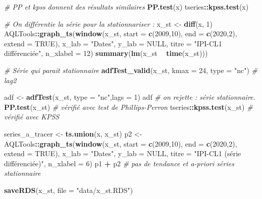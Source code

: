 \documentclass[french]{article}
\newenvironment{Shaded}{\begin{snugshade}}{\end{snugshade}}
\newcommand{\CommentTok}[1]{\textcolor[rgb]{0.56,0.35,0.01}{\textit{#1}}}
\newcommand{\DataTypeTok}[1]{\textcolor[rgb]{0.13,0.29,0.53}{#1}}
\newcommand{\DecValTok}[1]{\textcolor[rgb]{0.00,0.00,0.81}{#1}}
\newcommand{\KeywordTok}[1]{\textcolor[rgb]{0.13,0.29,0.53}{\textbf{#1}}}
\newcommand{\NormalTok}[1]{#1}
\newcommand{\OperatorTok}[1]{\textcolor[rgb]{0.81,0.36,0.00}{\textbf{#1}}}
\newcommand{\OtherTok}[1]{\textcolor[rgb]{0.56,0.35,0.01}{#1}}
\newcommand{\StringTok}[1]{\textcolor[rgb]{0.31,0.60,0.02}{#1}}
\begin{document}
\begin{Shaded}
\begin{Highlighting}[]
\CommentTok{# PP et kpss donnent des résultats similaires}
\KeywordTok{PP.test}\NormalTok{(x) }
\NormalTok{tseries}\OperatorTok{::}\KeywordTok{kpss.test}\NormalTok{(x)}


\CommentTok{# On différentie la série pour la stationnariser :}
\NormalTok{x_st <-}\StringTok{ }\KeywordTok{diff}\NormalTok{(x, }\DecValTok{1}\NormalTok{)}
\NormalTok{AQLTools}\OperatorTok{::}\KeywordTok{graph_ts}\NormalTok{(}\KeywordTok{window}\NormalTok{(x_st,}
                          \DataTypeTok{start =} \KeywordTok{c}\NormalTok{(}\DecValTok{2009}\NormalTok{,}\DecValTok{10}\NormalTok{),}
                          \DataTypeTok{end =} \KeywordTok{c}\NormalTok{(}\DecValTok{2020}\NormalTok{,}\DecValTok{2}\NormalTok{),}
                          \DataTypeTok{extend =} \OtherTok{TRUE}\NormalTok{), }\DataTypeTok{x_lab =} \StringTok{"Dates"}\NormalTok{, }\DataTypeTok{y_lab =} \OtherTok{NULL}\NormalTok{,}
                   \DataTypeTok{titre =} \StringTok{"IPI-CL1 différenciée"}\NormalTok{, }\DataTypeTok{n_xlabel =} \DecValTok{12}\NormalTok{)}
\KeywordTok{summary}\NormalTok{(}\KeywordTok{lm}\NormalTok{(x_st }\OperatorTok{~}\StringTok{ }\KeywordTok{time}\NormalTok{(x_st)))}

\CommentTok{# Série qui parait stationnaire }
\KeywordTok{adfTest_valid}\NormalTok{(x_st, }\DataTypeTok{kmax =} \DecValTok{24}\NormalTok{, }\DataTypeTok{type =} \StringTok{"nc"}\NormalTok{) }\CommentTok{# lag2}

\NormalTok{adf <-}\StringTok{ }\KeywordTok{adfTest}\NormalTok{(x_st, }\DataTypeTok{type =} \StringTok{"nc"}\NormalTok{,}\DataTypeTok{lags =} \DecValTok{1}\NormalTok{)}
\NormalTok{adf }\CommentTok{# on rejette : série stationnaire.}
\KeywordTok{PP.test}\NormalTok{(x_st) }\CommentTok{# vérifié avec test de Phillips-Perron}
\NormalTok{tseries}\OperatorTok{::}\KeywordTok{kpss.test}\NormalTok{(x_st) }\CommentTok{# vérifié avec KPSS}

\NormalTok{series_a_tracer <-}\StringTok{ }\KeywordTok{ts.union}\NormalTok{(x, x_st)}
\NormalTok{p2 <-}\StringTok{ }\NormalTok{AQLTools}\OperatorTok{::}\KeywordTok{graph_ts}\NormalTok{(}\KeywordTok{window}\NormalTok{(x_st,}
                                \DataTypeTok{start =} \KeywordTok{c}\NormalTok{(}\DecValTok{2009}\NormalTok{,}\DecValTok{10}\NormalTok{),}
                                \DataTypeTok{end =} \KeywordTok{c}\NormalTok{(}\DecValTok{2020}\NormalTok{,}\DecValTok{2}\NormalTok{),}
                                \DataTypeTok{extend =} \OtherTok{TRUE}\NormalTok{), }\DataTypeTok{x_lab =} \StringTok{"Dates"}\NormalTok{, }\DataTypeTok{y_lab =} \OtherTok{NULL}\NormalTok{,}
                         \DataTypeTok{titre =} \StringTok{"IPI-CL1 (série différenciée)"}\NormalTok{, }\DataTypeTok{n_xlabel =} \DecValTok{6}\NormalTok{)}
\NormalTok{p1 }\OperatorTok{+}\StringTok{ }\NormalTok{p2 }\CommentTok{# pas de tendance et a-priori séries stationnaire}

\KeywordTok{saveRDS}\NormalTok{(x_st, }\DataTypeTok{file =} \StringTok{"data/x_st.RDS"}\NormalTok{)}
\end{Highlighting}
\end{Shaded}
\end{document}
